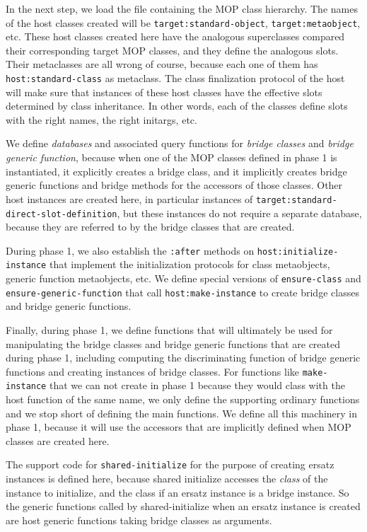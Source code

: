 In the next step, we load the file containing the MOP class hierarchy.
The names of the host classes created will be
\texttt{target:standard-object}, \texttt{target:metaobject}, etc.
These host classes created here have the analogous superclasses
compared their corresponding target MOP classes, and they define the
analogous slots.  Their metaclasses are all wrong of course, because
each one of them has \texttt{host:standard-class} as metaclass.  The
class finalization protocol of the host will make sure that instances
of these host classes have the effective slots determined by class
inheritance.  In other words, each of the classes define slots with
the right names, the right initargs, etc.

We define \emph{databases} and associated query functions for
\emph{bridge classes} and \emph{bridge generic function}, because when
one of the MOP classes defined in phase 1 is instantiated, it
explicitly creates a bridge class, and it implicitly creates bridge
generic functions and bridge methods for the accessors of those
classes.  Other host instances are created here, in particular
instances of \texttt{target:standard-direct-slot-definition}, but
these instances do not require a separate database, because they are
referred to by the bridge classes that are created. 

During phase 1, we also establish the \texttt{:after} methods on
\texttt{host:initialize-instance} that implement the initialization
protocols for class metaobjects, generic function metaobjects, etc.
We define special versions of \texttt{ensure-class} and
\texttt{ensure-generic-function} that call \texttt{host:make-instance}
to create bridge classes and bridge generic functions.

Finally, during phase 1, we define functions that will ultimately be
used for manipulating the bridge classes and bridge generic functions
that are created during phase 1, including computing the
discriminating function of bridge generic functions and creating
instances of bridge classes.  For functions like
\texttt{make-instance} that we can not create in phase 1 because they
would class with the host function of the same name, we only define
the supporting ordinary functions and we stop short of defining the
main functions.  We define all this machinery in phase 1, because it
will use the accessors that are implicitly defined when MOP classes
are created here. 

The support code for \texttt{shared-initialize} for the purpose of
creating ersatz instances is defined here, because shared initialize
accesses the \emph{class} of the instance to initialize, and the class
if an ersatz instance is a bridge instance.  So the generic functions
called by shared-initialize when an ersatz instance is created are
host generic functions taking bridge classes as arguments. 

